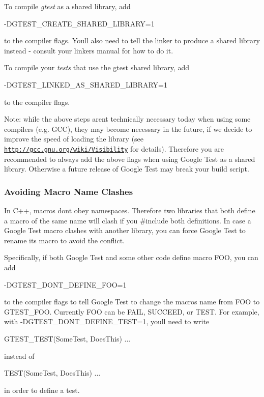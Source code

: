 To compile {\itshape gtest} as a shared library, add \begin{DoxyVerb}-DGTEST_CREATE_SHARED_LIBRARY=1
\end{DoxyVerb}


to the compiler flags. You\textquotesingle{}ll also need to tell the linker to produce a shared library instead -\/ consult your linker\textquotesingle{}s manual for how to do it.

To compile your {\itshape tests} that use the gtest shared library, add \begin{DoxyVerb}-DGTEST_LINKED_AS_SHARED_LIBRARY=1
\end{DoxyVerb}


to the compiler flags.

Note\+: while the above steps aren\textquotesingle{}t technically necessary today when using some compilers (e.\+g. G\+CC), they may become necessary in the future, if we decide to improve the speed of loading the library (see \href{http://gcc.gnu.org/wiki/Visibility}{\tt http\+://gcc.\+gnu.\+org/wiki/\+Visibility} for details). Therefore you are recommended to always add the above flags when using Google Test as a shared library. Otherwise a future release of Google Test may break your build script.

\subsubsection*{Avoiding Macro Name Clashes}

In C++, macros don\textquotesingle{}t obey namespaces. Therefore two libraries that both define a macro of the same name will clash if you {\ttfamily \#include} both definitions. In case a Google Test macro clashes with another library, you can force Google Test to rename its macro to avoid the conflict.

Specifically, if both Google Test and some other code define macro F\+OO, you can add \begin{DoxyVerb}-DGTEST_DONT_DEFINE_FOO=1
\end{DoxyVerb}


to the compiler flags to tell Google Test to change the macro\textquotesingle{}s name from {\ttfamily F\+OO} to {\ttfamily G\+T\+E\+S\+T\+\_\+\+F\+OO}. Currently {\ttfamily F\+OO} can be {\ttfamily F\+A\+IL}, {\ttfamily S\+U\+C\+C\+E\+ED}, or {\ttfamily T\+E\+ST}. For example, with {\ttfamily -\/D\+G\+T\+E\+S\+T\+\_\+\+D\+O\+N\+T\+\_\+\+D\+E\+F\+I\+N\+E\+\_\+\+T\+E\+ST=1}, you\textquotesingle{}ll need to write \begin{DoxyVerb}GTEST_TEST(SomeTest, DoesThis) { ... }
\end{DoxyVerb}


instead of \begin{DoxyVerb}TEST(SomeTest, DoesThis) { ... }
\end{DoxyVerb}


in order to define a test. 
